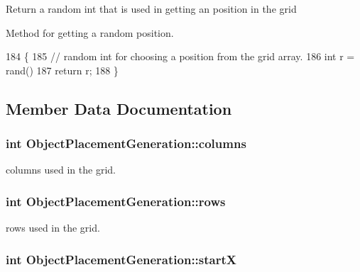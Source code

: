 Return a random int that is used in getting an position in the grid

Method for getting a random position. 



 

 
\begin{DoxyCode}
184 \{
185     \textcolor{comment}{// random int for choosing a position from the grid array.}
186     \textcolor{keywordtype}{int} r = rand() %
187     \textcolor{keywordflow}{return} r;
188 \}
\end{DoxyCode}


\subsection{Member Data Documentation}
\hypertarget{class_object_placement_generation_a872cbf261b7aac7c6f9c570b56d92acd}{
\subsubsection[{columns}]{\setlength{\rightskip}{0pt plus 5cm}int Object\-Placement\-Generation\-::columns\hspace{0.3cm}{\ttfamily [private]}}}\label{class_object_placement_generation_a872cbf261b7aac7c6f9c570b56d92acd}


columns used in the grid. 

\hypertarget{class_object_placement_generation_a9de1ce3954d2a5aff10af4e88bb26516}{
\subsubsection[{rows}]{\setlength{\rightskip}{0pt plus 5cm}int Object\-Placement\-Generation\-::rows\hspace{0.3cm}{\ttfamily [private]}}}\label{class_object_placement_generation_a9de1ce3954d2a5aff10af4e88bb26516}


rows used in the grid. 

\hypertarget{class_object_placement_generation_a265fa21c083b78b5c98410436ff33d72}{
\subsubsection[{start\-X}]{\setlength{\rightskip}{0pt plus 5cm}int Object\-Placement\-Generation\-::start\-X\hspace{0.3cm}{\ttfamily [private]}}}\label{class_object_placement_generation_a265fa21c083b78b5c98410436ff33d72}


